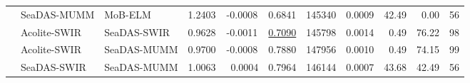 \begin{landscape}
\begin{table}[htb!]
\begin{tabular}{cllcccccccc}
      &   SeaDAS-MUMM   &  MoB-ELM      & 1.2403  & -0.0008 & 0.6841  & 145340  & 0.0009  &  42.49      & ~0.00            &   56      \\ 
      &   Acolite-SWIR  &  SeaDAS-SWIR  & 0.9628  & -0.0011 & \underline{0.7090}  & 145798  & 0.0014  &  ~0.49      & 76.22            &   98      \\
      &   Acolite-SWIR  &  SeaDAS-MUMM  & 0.9700  & -0.0008 & 0.7880  & 147956  & 0.0010  &  ~0.49      & 74.15            &   99      \\
      &   SeaDAS-SWIR   &  SeaDAS-MUMM  & 1.0063  & ~0.0004 & 0.7964  & 146144  & 0.0007  &  43.68      & 42.49            &   56      \\
 \end{tabular}
\end{table}
\end{landscape}
